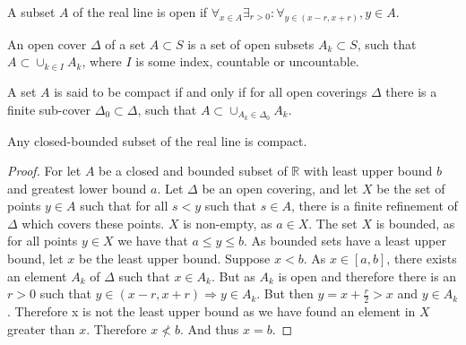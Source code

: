 \documentclass[crop=false,class=book,oneside]{standalone}
\begin{document}
            \begin{definition}
                A subset $A$ of the real line is open if
                $\forall_{x\in A}\exists_{r>0}:
                \forall_{y\in (x-r,x+r)},y\in A$.
            \end{definition}
            \begin{definition}
                An open cover $\Delta$ of a set $A\subset S$ is a set
                of open subsets $A_k\subset S$, such that
                $A\subset\cup_{k\in I}A_{k}$, where $I$ is some
                index, countable or uncountable.
            \end{definition}
            \begin{definition}
                A set $A$ is said to be compact if and
                only if for all open coverings $\Delta$ there is
                a finite sub-cover $\Delta_0\subset \Delta$, such
                that $A\subset \cup_{A_k \in \Delta_0} A_k$.
            \end{definition}
            \begin{theorem}
                Any closed-bounded subset of the real line is compact. 
            \end{theorem}
            \begin{proof}
                For let $A$ be a closed and bounded subset of
                $\mathbb{R}$ with least upper bound $b$ and
                greatest lower bound $a$. Let $\Delta$ be an
                open covering, and let $X$ be the set of
                points $y\in A$ such that for all $s<y$ such
                that $s\in A$, there is a finite refinement
                of $\Delta$ which covers these points. $X$ is
                non-empty, as $a\in X$. The set $X$ is bounded,
                as for all points $y\in X$ we have that
                $a\leq y\leq b$. As bounded sets have a least
                upper bound, let $x$ be the least upper bound.
                Suppose $x<b$. As $x\in [a,b]$, there exists an
                element $A_k$ of $\Delta$ such that $x \in A_k$.
                But as $A_k$ is open and therefore there is an
                $r>0$ such that
                $y\in (x-r,x+r)\Rightarrow y \in A_k$.
                But then $y=x+\frac{r}{2}>x$ and
                $y\in A_k$. Therefore x is not the
                least upper bound as we have found an
                element in $X$ greater than $x$.
                Therefore $x\not<b$. And thus $x=b$.
            \end{proof}
\end{document}

